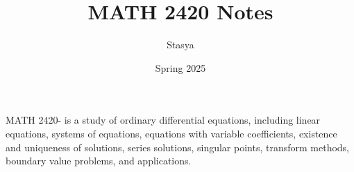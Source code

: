 \documentclass[10pt,a4paper,oneside]{book}
\title{MATH 2420 Notes}
\author{Stasya}
\date{Spring 2025}
\begin{document}
\maketitle
\bigbreak
\begin{center}
    MATH 2420- is a study of ordinary differential equations, including linear equations, systems of equations, 
    equations with variable coefficients, existence and uniqueness of solutions, series solutions, singular points, 
    transform methods, boundary value problems, and applications.
\end{center}
\bigbreak
\tableofcontents

\end{document}
